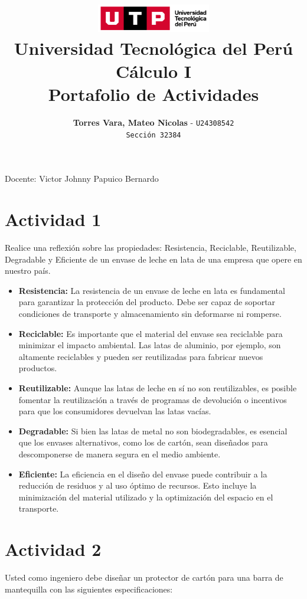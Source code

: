 \documentclass[12pt]{article}
\title{
  \vspace{2cm}
  \pagenumbering{gobble}
  \includegraphics[width=5cm]{../assets/logo-utp.png} \\
  \vspace{1cm}
  \textbf{Universidad Tecnológica del Perú} \\
  \vspace{2cm}
  \textbf{Cálculo I} \\
  \vspace{1cm}
  \large \textbf{Portafolio de Actividades}
}
\author{
  \textbf{Torres Vara, Mateo Nicolas} - \texttt{U24308542} \\
  \texttt{Sección 32384}
}
\begin{document}
\maketitle
\begin{center}

  Docente: Victor Johnny Papuico Bernardo

\end{center}

%
%

\newpage
\section*{Actividad 1}
\noindent Realice una reflexión sobre las propiedades: Resistencia, Reciclable, Reutilizable,
Degradable y Eficiente de un envase de leche en lata de una empresa que opere en nuestro
país.

\begin{itemize}
    \item \textbf{Resistencia:} La resistencia de un envase de leche en lata es fundamental para garantizar la protección del producto. Debe ser capaz de soportar condiciones de transporte y almacenamiento sin deformarse ni romperse.
    \item \textbf{Reciclable:} Es importante que el material del envase sea reciclable para minimizar el impacto ambiental. Las latas de aluminio, por ejemplo, son altamente reciclables y pueden ser reutilizadas para fabricar nuevos productos.
    \item \textbf{Reutilizable:} Aunque las latas de leche en sí no son reutilizables, es posible fomentar la reutilización a través de programas de devolución o incentivos para que los consumidores devuelvan las latas vacías.
    \item \textbf{Degradable:} Si bien las latas de metal no son biodegradables, es esencial que los envases alternativos, como los de cartón, sean diseñados para descomponerse de manera segura en el medio ambiente.
    \item \textbf{Eficiente:} La eficiencia en el diseño del envase puede contribuir a la reducción de residuos y al uso óptimo de recursos. Esto incluye la minimización del material utilizado y la optimización del espacio en el transporte.
\end{itemize}




\newpage
\section*{Actividad 2}
\noindent Usted como ingeniero debe diseñar un protector de cartón para una barra de mantequilla con las siguientes especificaciones: \\
\end{document}
